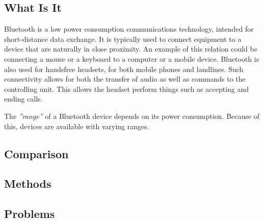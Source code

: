 \subsection{What Is It}
\cite{ieee_bluetooth_standard}
Bluetooth is a low power consumption communications technology, intended for short-distance data exchange.
It is typically used to connect equipment to a device that are naturally in close proximity.
An example of this relation could be connecting a mouse or a keyboard to a computer or a mobile device.
Bluetooth is also used for handsfree headsets, for both mobile phones and landlines.
Such connectivity allows for both the transfer of audio as well as commands to the controlling unit.
This allows the headset perform things such as accepting and ending calls.

The \textit{''range''} of a Bluetooth device depends on its power consumption.
Because of this, devices are available with varying ranges.


\subsection{Comparison}

\subsection{Methods}

\subsection{Problems}
